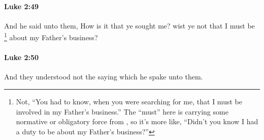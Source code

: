 		\paragraph{Luke 2:49} %
			\label{LUKE-2-49}

			And he said unto them, How is it that ye sought me? wist ye not that I must be%
				\footnote{%
					Not, ``You had to know, when you were searching for me, that I must be involved in my Father's business.'' The ``must'' here is carrying some normative or obligatory force from , so it's more like, ``Didn't you know I had a duty to be about my Father's business?''
					}
			about my Father's business?

			\begin{framed}
			\scriptsize
				\begin{compactdesc}
					\item[SBLG] 
				\end{compactdesc}
			\end{framed}

		\paragraph{Luke 2:50} %
			\label{LUKE-2-50}

			And they understood not the saying which he spake unto them.

